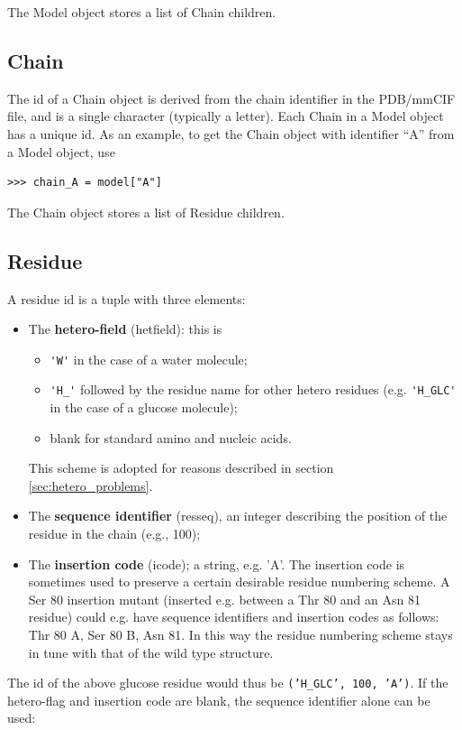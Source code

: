 The Model object stores a list of Chain children.

\subsection{Chain}

The id of a Chain object is derived from the chain identifier in the PDB/mmCIF
file, and is a single character (typically a letter). Each Chain in a Model object has a unique id. As an example, to get the Chain object with identifier ``A'' from a Model object, use
\begin{verbatim}
>>> chain_A = model["A"]
\end{verbatim}

The Chain object stores a list of Residue children.

\subsection{Residue}

A residue id is a tuple with three elements:

\begin{itemize}
\item The \textbf{hetero-field} (hetfield): this is
    \begin{itemize}
    \item \verb+'W'+ in the case of a water molecule;
    \item \verb+'H_'+ followed by the residue name for other hetero residues (e.g. \verb+'H_GLC'+ in the case of a glucose molecule);
    \item blank for standard amino and nucleic acids.
    \end{itemize}
This scheme is adopted for reasons described in section \ref{sec:hetero_problems}.
\item The \textbf{sequence identifier} (resseq), an integer describing the position of the residue in the chain (e.g., 100);
\item The \textbf{insertion code} (icode); a string, e.g. 'A'. The insertion code is sometimes used to preserve a certain desirable residue numbering scheme. A Ser 80 insertion mutant (inserted e.g. between a Thr 80 and an Asn 81
residue) could e.g. have sequence identifiers and insertion codes
as follows: Thr 80 A, Ser 80 B, Asn 81. In this way the residue numbering
scheme stays in tune with that of the wild type structure.
\end{itemize}
The id of the above glucose residue would thus be \texttt{('H\_GLC',
100, 'A')}. If the hetero-flag and insertion code are blank, the sequence
identifier alone can be used:

